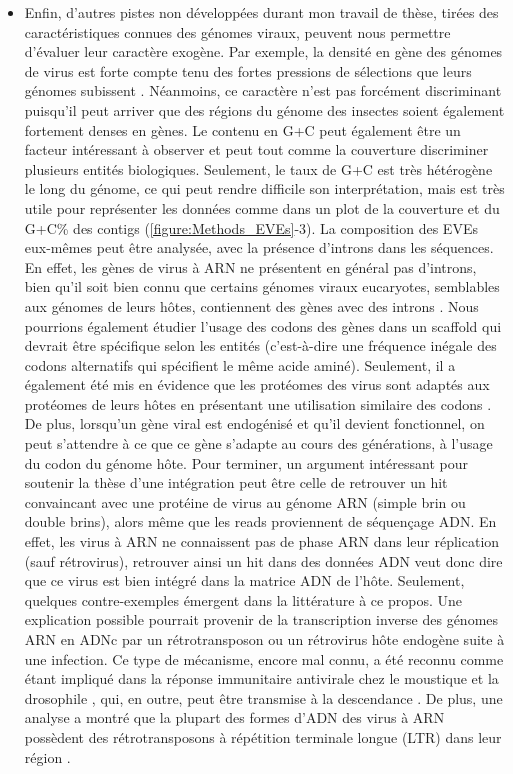 \begin{itemize}
    \item Enfin, d'autres pistes non développées durant mon travail de thèse, tirées des caractéristiques connues des génomes viraux, peuvent nous permettre d'évaluer leur caractère exogène. Par exemple, la densité en gène des génomes de virus est forte compte tenu des fortes pressions de sélections que leurs génomes subissent \citep{mahmoudabadi_comprehensive_2018}. Néanmoins, ce caractère n'est pas forcément discriminant puisqu'il peut arriver que des régions du génome des insectes soient également fortement denses en gènes. Le contenu en G+C peut également être un facteur intéressant à observer et peut tout comme la couverture discriminer plusieurs entités biologiques. Seulement, le taux de G+C est très hétérogène le long du génome, ce qui peut rendre difficile son interprétation, mais est très utile pour représenter les données comme dans un plot de la couverture et du G+C\% des contigs (\figurename{\ref{figure:Methods_EVEs}}-3). La composition des EVEs eux-mêmes peut être analysée, avec la présence d'introns dans les séquences. En effet, les gènes de virus à ARN ne présentent en général pas d'introns, bien qu'il soit bien connu que certains génomes viraux eucaryotes, semblables aux génomes de leurs hôtes, contiennent des gènes avec des introns \citep{mahmoudabadi_comprehensive_2018}. Nous pourrions également étudier l'usage des codons des gènes dans un scaffold qui devrait être spécifique selon les entités (c'est-à-dire une fréquence inégale des codons alternatifs qui spécifient le même acide aminé). Seulement, il a également été mis en évidence que les protéomes des virus sont adaptés aux protéomes de leurs hôtes en présentant une utilisation similaire des codons \citep{tian_adaptation_2018,bahir_viral_2009}. De plus, lorsqu'un gène viral est endogénisé et qu'il devient fonctionnel, on peut s'attendre à ce que ce gène s'adapte au cours des générations, à l'usage du codon du génome hôte. 
    Pour terminer, un argument intéressant pour soutenir la thèse d'une intégration peut être celle de retrouver un hit convaincant avec une protéine de virus au génome ARN (simple brin ou double brins), alors même que les reads proviennent de séquençage ADN. En effet, les virus à ARN ne connaissent pas de phase ARN dans leur réplication (sauf rétrovirus), retrouver ainsi un hit dans des données ADN veut donc dire que ce virus est bien intégré dans la matrice ADN de l'hôte. Seulement, quelques contre-exemples émergent dans la littérature à ce propos. Une explication possible pourrait provenir de la transcription inverse des génomes ARN en ADNc par un rétrotransposon ou un rétrovirus hôte endogène \citep{klenerman_non-retroviral_1997} suite à une infection. Ce type de mécanisme, encore mal connu, a été reconnu comme étant impliqué dans la réponse immunitaire antivirale chez le moustique et la drosophile \citep{goic_rna-mediated_2013,goic_virus-derived_2016,tassetto_control_2019}, qui, en outre, peut être transmise à la descendance \citep{mondotte_evidence_2020}. De plus, une analyse a montré que la plupart des formes d'ADN des virus à ARN possèdent des rétrotransposons à répétition terminale longue (LTR) dans leur région \citep{goic_virus-derived_2016}.\\
\end{itemize}

